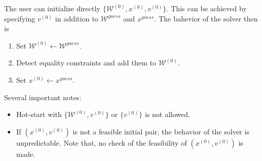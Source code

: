 \documentclass[12pt,a4paper]{article}
\begin{document}
The user can initialize directly $\{\mathcal{W}^{(0)}, x^{(0)}, v^{(0)}\}$. This can be achieved by
specifying $v^{(0)}$ in addition to $\mathcal{W}^{\mathit{guess}}$ and $x^{\mathit{guess}}$. The bahevior of the solver then is 
%
\begin{enumerate}
\item Set $\mathcal{W}^{(0)} \leftarrow \mathcal{W}^{\mathit{guess}}$.
\item Detect equality constraints and add them to $\mathcal{W}^{(0)}$.
\item Set $x^{(0)} \leftarrow x^{\mathit{guess}}$.
\end{enumerate}
%
Several important notes:
%
\begin{itemize}
\item Hot-start with $\{\mathcal{W}^{(0)}, v^{(0)}\}$ or $\{v^{(0)}\}$ is not allowed.
\item If $(x^{(0)}, v^{(0)})$ is not a feasible initial pair, the behavior of the solver is
  unpredictable. Note that, no check of the feasibility of $(x^{(0)}, v^{(0)})$ is made.
\end{itemize}
\end{document}
